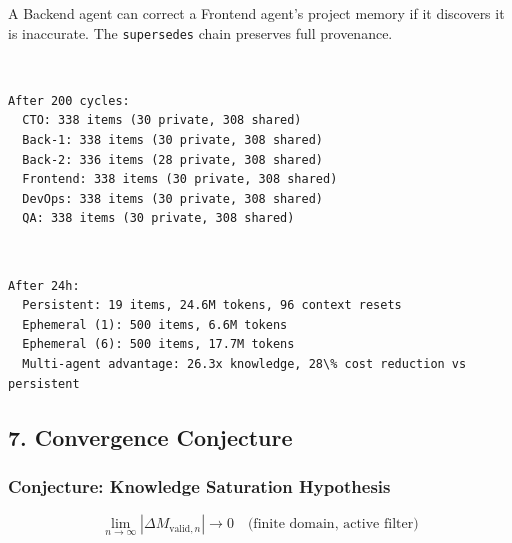 \documentclass[11pt]{article}
\begin{document}
A Backend agent can correct a Frontend agent's project memory if it
discovers it is inaccurate. The \texttt{supersedes} chain preserves full
provenance.

    \begin{center}
    \end{center}
    { \hspace*{\fill} \\}
    
    \begin{Verbatim}[commandchars=\\\{\}]
After 200 cycles:
  CTO: 338 items (30 private, 308 shared)
  Back-1: 338 items (30 private, 308 shared)
  Back-2: 336 items (28 private, 308 shared)
  Frontend: 338 items (30 private, 308 shared)
  DevOps: 338 items (30 private, 308 shared)
  QA: 338 items (30 private, 308 shared)
    \end{Verbatim}

    \begin{center}
    \end{center}
    { \hspace*{\fill} \\}
    
    \begin{Verbatim}[commandchars=\\\{\}]
After 24h:
  Persistent: 19 items, 24.6M tokens, 96 context resets
  Ephemeral (1): 500 items, 6.6M tokens
  Ephemeral (6): 500 items, 17.7M tokens
  Multi-agent advantage: 26.3x knowledge, 28\% cost reduction vs persistent
    \end{Verbatim}

    \subsection{7. Convergence Conjecture}\label{convergence-conjecture}

\subsubsection{Conjecture: Knowledge Saturation
Hypothesis}\label{conjecture-knowledge-saturation-hypothesis}

\[\lim_{n \to \infty} |\Delta M_{\text{valid},n}| \to 0 \quad \text{(finite domain, active filter)}\]
\end{document}
